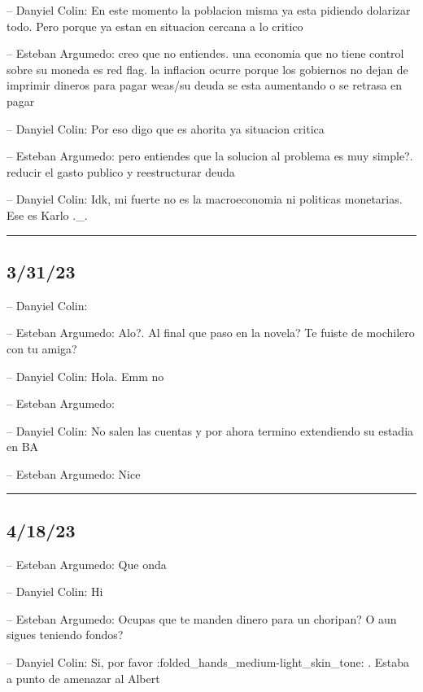 -- Danyiel Colin: En este momento la poblacion misma ya esta pidiendo
dolarizar todo. Pero porque ya estan en situacion cercana a lo critico

-- Esteban Argumedo: creo que no entiendes. una economia que no tiene
control sobre su moneda es red flag. la inflacion ocurre porque los
gobiernos no dejan de imprimir dineros para pagar weas/su deuda se esta
aumentando o se retrasa en pagar

-- Danyiel Colin: Por eso digo que es ahorita ya situacion critica

-- Esteban Argumedo: pero entiendes que la solucion al problema es muy
simple?. reducir el gasto publico y reestructurar deuda

-- Danyiel Colin: Idk, mi fuerte no es la macroeconomia ni politicas
monetarias. Ese es Karlo .\_.

\begin{center}\rule{0.5\linewidth}{0.5pt}\end{center}

\hypertarget{section-193}{%
\subsection{3/31/23}\label{section-193}}

-- Danyiel Colin:

-- Esteban Argumedo: Alo?. Al final que paso en la novela? Te fuiste de
mochilero con tu amiga?

-- Danyiel Colin: Hola. Emm no

-- Esteban Argumedo:

-- Danyiel Colin: No salen las cuentas y por ahora termino extendiendo
su estadia en BA

-- Esteban Argumedo: Nice

\begin{center}\rule{0.5\linewidth}{0.5pt}\end{center}

\hypertarget{section-194}{%
\subsection{4/18/23}\label{section-194}}

-- Esteban Argumedo: Que onda

-- Danyiel Colin: Hi

-- Esteban Argumedo: Ocupas que te manden dinero para un choripan? O aun
sigues teniendo fondos?

-- Danyiel Colin: Si, por favor
:folded\_hands\_medium-light\_skin\_tone: . Estaba a punto de amenazar
al Albert

